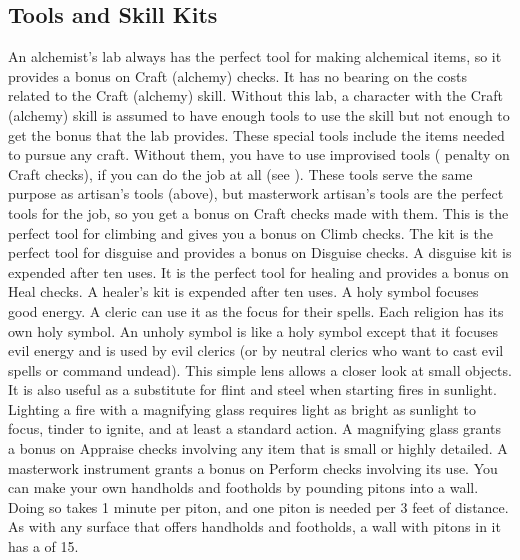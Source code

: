     \subsection{Tools and Skill Kits}
         An alchemist's lab always has the perfect tool for making alchemical items, so it provides a  bonus on Craft (alchemy) checks. It has no bearing on the costs related to the Craft (alchemy) skill. Without this lab, a character with the Craft (alchemy) skill is assumed to have enough tools to use the skill but not enough to get the  bonus that the lab provides.
         These special tools include the items needed to pursue any craft. Without them, you have to use improvised tools ( penalty on Craft checks), if you can do the job at all (see ).
         These tools serve the same purpose as artisan's tools (above), but masterwork artisan's tools are the perfect tools for the job, so you get a  bonus on Craft checks made with them.
         This is the perfect tool for climbing and gives you a  bonus on Climb checks.
         The kit is the perfect tool for disguise and provides a  bonus on Disguise checks. A disguise kit is expended after ten uses.
         It is the perfect tool for healing and provides a  bonus on Heal checks. A healer's kit is expended after ten uses.
         A holy symbol focuses good energy. A cleric can use it as the focus for their spells. Each religion has its own holy symbol.
         An unholy symbol is like a holy symbol except that it focuses evil energy and is used by evil clerics (or by neutral clerics who want to cast evil spells or command undead).
         This simple lens allows a closer look at small objects. It is also useful as a substitute for flint and steel when starting fires in sunlight. Lighting a fire with a magnifying glass requires light as bright as sunlight to focus, tinder to ignite, and at least a standard action.
        A magnifying glass grants a  bonus on Appraise checks involving any item that is small or highly detailed.
         A masterwork instrument grants a  bonus on Perform checks involving its use.
         You can make your own handholds and footholds by pounding pitons into a wall. Doing so takes 1 minute per piton, and one piton is needed per 3 feet of distance. As with any surface that offers handholds and footholds, a wall with pitons in it has a  of 15.
